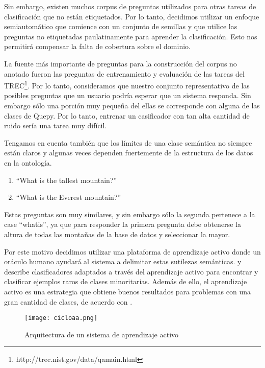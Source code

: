 Sin embargo, existen muchos corpus de preguntas utilizados para otras tareas de clasificación que no están etiquetados. Por lo tanto, decidimos utilizar un enfoque semiautomático que comience con un conjunto de semillas y que utilice las preguntas no etiquetadas paulatinamente para aprender la clasificación. Esto nos permitirá compensar la falta de cobertura sobre el dominio.

La fuente más importante de preguntas para la construcción del corpus no anotado fueron las preguntas de entrenamiento y evaluación de las tareas del TREC\footnote{http://trec.nist.gov/data/qamain.html}. Por lo tanto, consideramos que nuestro conjunto representativo de las posibles preguntas que un usuario podría esperar que un sistema responda. Sin embargo sólo una porción muy pequeña del ellas se corresponde con alguna de las clases de Quepy. Por lo tanto, entrenar un casificador con tan alta cantidad de ruido sería una tarea muy difícil.

Tengamos en cuenta también que los límites de una clase semántica no siempre están claros y algunas veces dependen fuertemente de la estructura de los datos en la ontología.

\begin{example}\label{preguntas-similares}\hfill
    \begin{enumerate}
    \item ``What is the tallest mountain?''
    \item ``What is the Everest mountain?''
    \end{enumerate}
\end{example}

Estas preguntas son muy similares, y sin embargo sólo la segunda pertenece a la case ``whatis'', ya que para responder la primera pregunta debe obtenerse la altura de todas las montañas de la base de datos y seleccionar la mayor.

Por este motivo decidimos utilizar una plataforma de aprendizaje activo donde un oráculo humano ayudará al sistema a delimitar estas sutilezas semánticas. \citet{rare-classes-holpedales} y \citet{AL-imbalanced-Ertekin} describe clasificadores adaptados a través del aprendizaje activo para encontrar y clasificar ejemplos raros de clases minoritarias. Además de ello, el aprendizaje activo es una estrategia que obtiene buenos resultados para problemas con una gran cantidad de clases, de acuerdo con \citet{al-multiclass-jain}.

\begin{figure}[h]\label{cicloaa}
\caption{Arquitectura de un sistema de aprendizaje activo}
\texttt{[image: cicloaa.png]}
\centering
\end{figure}

